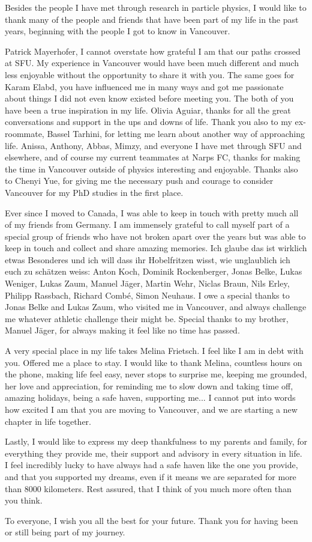 Besides the people I have met through research in particle physics, I would like to thank many of the people and friends that have been part of my life in the past years, beginning with the people I got to know in Vancouver. 

Patrick Mayerhofer, I cannot overstate how grateful I am that our paths crossed at SFU. My experience in Vancouver would have been much different and much less enjoyable without the opportunity to share it with you. 
The same goes for Karam Elabd, you have influenced me in many ways and got me passionate about things I did not even know existed before meeting you.
The both of you have been a true inspiration in my life.
Olivia Aguiar, thanks for all the great conversations and support in the ups and downs of life. 
Thank you also to my ex-roommate, Bassel Tarhini, for letting me learn about another way of approaching life. 
Anissa, Anthony, Abbas, Mimzy, and everyone I have met through SFU and elsewhere, and of course my current teammates at Narps FC, thanks for making the time in Vancouver outside of physics interesting and enjoyable. 
Thanks also to Chenyi Yue, for giving me the necessary push and courage to consider Vancouver for my PhD studies in the first place. 

Ever since I moved to Canada, I was able to keep in touch with pretty much all of my friends from Germany. 
I am immensely grateful to call myself part of a special group of friends who have not broken apart over the years but was able to keep in touch and collect and share amazing memories.
Ich glaube das ist wirklich etwas Besonderes und ich will dass ihr Hobelfritzen wisst, wie unglaublich ich euch zu schätzen weiss: 
Anton Koch, Dominik Rockenberger, Jonas Belke, Lukas Weniger, Lukas Zaum, Manuel Jäger, Martin Wehr, Niclas Braun, Nils Erley, Philipp Rassbach, Richard Combé, Simon Neuhaus.
I owe a special thanks to Jonas Belke and Lukas Zaum, who visited me in Vancouver,  and always challenge me whatever athletic challenge their might be. 
Special thanks to my brother, Manuel Jäger, for always making it feel like no time has passed. 


A very special place in my life takes Melina Frietsch. 
I feel like I am in debt with you. 
Offered me a place to stay. 
I would like to thank Melina, countless hours on the phone, making life feel easy, never stops to surprise me, keeping me grounded, her love and appreciation, for reminding me to slow down and taking time off, amazing holidays, being a safe haven, supporting me...
I cannot put into words how excited I am that you are moving to Vancouver, and we are starting a new chapter in life together.

Lastly, I would like to express my deep thankfulness to my parents and family, for everything they provide me, their support and advisory in every situation in life. 
I feel incredibly lucky to have always had a safe haven like the one you provide, and that you supported my dreams, even if it means we are separated for more than 8000 kilometers. Rest assured, that I think of you much more often than you think.

To everyone, I wish you all the best for your future. Thank you for having been or still being part of my journey. 

